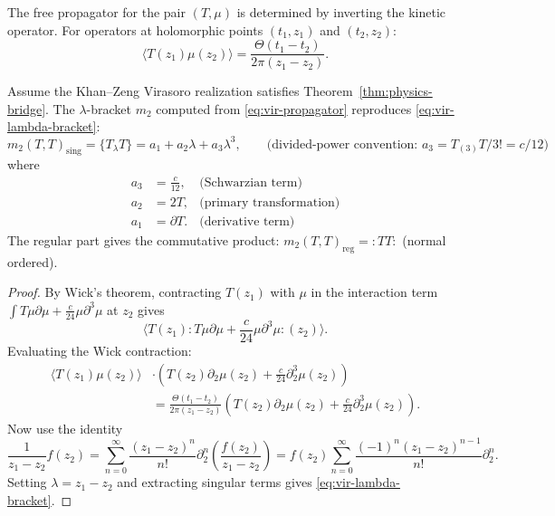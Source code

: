 The free propagator for the pair $(T, \mu)$ is determined by inverting the kinetic operator. For operators at holomorphic points $(t_1, z_1)$ and $(t_2, z_2)$:
\begin{equation}
\langle T(z_1) \mu(z_2) \rangle = \frac{\Theta(t_1 - t_2)}{2\pi(z_1 - z_2)}.
\end{equation}

\begin{proposition}
Assume the Khan--Zeng Virasoro realization satisfies
Theorem~\ref{thm:physics-bridge}.
The $\lambda$-bracket $m_2$ computed from \eqref{eq:vir-propagator} reproduces \eqref{eq:vir-lambda-bracket}:
\begin{equation}
m_2(T, T)_\text{sing} = \{T_\lambda T\} = a_1 + a_2 \lambda + a_3 \lambda^3,
 \qquad\text{(divided-power convention: $a_3 = T_{(3)}T/3! = c/12$)}
\end{equation}
where
\begin{align}
a_3 &= \frac{c}{12}, & \text{(Schwarzian term)}\\
a_2 &= 2T, & \text{(primary transformation)}\\
a_1 &= \partial T. & \text{(derivative term)}
\end{align}
The regular part gives the commutative product: $m_2(T,T)_\text{reg} = :TT:$ (normal ordered).
\end{proposition}

\begin{proof}
By Wick's theorem, contracting $T(z_1)$ with $\mu$ in the interaction term $\int T\mu\partial\mu + \frac{c}{24}\mu\partial^3\mu$ at $z_2$ gives
\[
\langle T(z_1) : T\mu\partial\mu + \frac{c}{24}\mu\partial^3\mu :(z_2) \rangle.
\]
Evaluating the Wick contraction:
\begin{align*}
\langle T(z_1) \mu(z_2) \rangle &\cdot \left( T(z_2) \partial_2 \mu(z_2) + \frac{c}{24} \partial_2^3 \mu(z_2) \right)\\
&= \frac{\Theta(t_1-t_2)}{2\pi(z_1-z_2)} \left( T(z_2) \partial_2 \mu(z_2) + \frac{c}{24} \partial_2^3 \mu(z_2) \right).
\end{align*}
Now use the identity
\[
\frac{1}{z_1 - z_2} f(z_2) = \sum_{n=0}^\infty \frac{(z_1-z_2)^n}{n!} \partial_2^n \left( \frac{f(z_2)}{z_1-z_2} \right) = f(z_2) \sum_{n=0}^\infty \frac{(-1)^n (z_1-z_2)^{n-1}}{n!} \partial_2^n.
\]
Setting $\lambda = z_1 - z_2$ and extracting singular terms gives \eqref{eq:vir-lambda-bracket}.
\end{proof}

